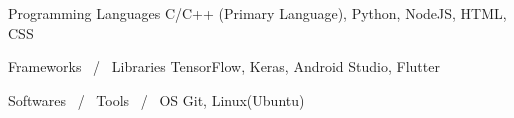 

\begin{cvskills}

  \cvskill
    {Programming Languages} %
    {C/C++ (Primary Language), Python, NodeJS, HTML, CSS} %


  \cvskill
    {Frameworks \, / \, Libraries} %
    {TensorFlow, Keras, Android Studio, Flutter} %

\cvskill
    {Softwares \, / \, Tools \, / \, OS} %
    {Git, Linux(Ubuntu)} %

\end{cvskills}

